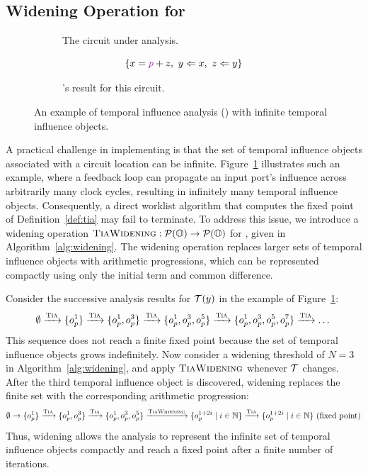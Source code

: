 \subsection{Widening Operation for \tia}

\begin{figure}[tp]
    \hfill
    \begin{subfigure}[b]{.3\textwidth}
        
        \caption{The circuit under analysis.}
    \end{subfigure}
    \hfill
    \begin{subfigure}[b]{.6\textwidth}
        \centering
        \[
        \left\{ x = \textpurple{p} + z,\ y \Leftarrow x,\ z \Leftarrow y\right\}
        \]
        \caption{Formal representation of this circuit.}
        \vspace{1ex}
        
        \caption{\tia's result for this circuit.}
    \end{subfigure}
    \hfill
    \caption{An example of temporal influence analysis (\tia) with infinite temporal influence objects.}\label{fig:inf}
\end{figure}

A practical challenge in implementing \tia is that the set of temporal influence objects associated with a circuit location can be infinite.
Figure~\ref{fig:inf} illustrates such an example, where a feedback loop can propagate an input port's influence across arbitrarily many clock cycles, resulting in infinitely many temporal influence objects.
Consequently, a direct worklist algorithm that computes the fixed point of Definition~\ref{def:tia} may fail to terminate.
To address this issue, we introduce a widening operation $\textsc{TiaWidening} : \mathcal{P}(\mathbb{O}) \to \mathcal{P}(\mathbb{O})$ for \tia, given in Algorithm~\ref{alg:widening}.
The widening operation replaces larger sets of temporal influence objects with arithmetic progressions, which can be represented compactly using only the initial term and common difference.

Consider the successive analysis results for $\mathcal{T}(y)$ in the \tia example of Figure~\ref{fig:inf}:
\[
\emptyset \xrightarrow{ \textsc{Tia} } \{o_p^1\} \xrightarrow{ \textsc{Tia} } \{o_p^1, o_p^3\} \xrightarrow{ \textsc{Tia} } \{o_p^1, o_p^3, o_p^5\} \xrightarrow{ \textsc{Tia} } \{o_p^1, o_p^3, o_p^5, o_p^7\} \xrightarrow{ \textsc{Tia} } \dots
\]
This sequence does not reach a finite fixed point because the set of temporal influence objects grows indefinitely.
Now consider a widening threshold of $N=3$ in
Algorithm~\ref{alg:widening}, and apply $\textsc{TiaWidening}$ whenever $\mathcal{T}$ changes.
After the third temporal influence object is discovered, widening replaces the finite set with the corresponding arithmetic progression:
\[
\emptyset \to \{o_p^1\} \xrightarrow{ \textsc{Tia} } \{o_p^1, o_p^3\} \xrightarrow{ \textsc{Tia} } \{o_p^1, o_p^3, o_p^5\} \xrightarrow{ \textsc{TiaWidening} } \{o_p^{1+2i}\mid i \in \mathbb{N}\} \xrightarrow{ \textsc{Tia} } \{o_p^{1+2i}\mid i \in \mathbb{N}\}\ \text{(fixed point)}
\]
Thus, widening allows the analysis to represent the infinite set of temporal influence objects compactly and reach a fixed point after a finite number of iterations.

